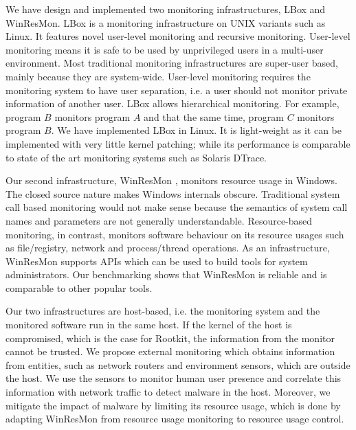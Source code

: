 We have design and implemented two monitoring infrastructures,
LBox and WinResMon.
LBox \cite{wu2005user} is a monitoring infrastructure on UNIX variants such as Linux.
It features novel user-level monitoring and recursive monitoring.
User-level monitoring means it is
safe to be used by unprivileged users in a multi-user environment.
Most traditional monitoring infrastructures are super-user based,
mainly because they are system-wide.
User-level monitoring requires the monitoring system to have user separation,
i.e. a user should not monitor private information of another user.
LBox allows hierarchical monitoring.
For example, program $B$ monitors program $A$ and that the same time,
program $C$ monitors program $B$.
We have implemented LBox in Linux.
It is light-weight as it can be implemented with very little kernel patching;
while its performance is comparable to state of the art monitoring systems
such as Solaris DTrace.

Our second infrastructure, WinResMon \cite{ramnath2006winresmon},
monitors resource usage in Windows.
The closed source nature makes Windows internals obscure.
Traditional system call based monitoring would not make sense
because the semantics of system call names and parameters are not
generally understandable.
Resource-based monitoring, in contrast,
monitors software behaviour on its resource usages such as
file/registry, network and process/thread operations.
As an infrastructure, WinResMon supports APIs which
can be used to build tools for system administrators.
Our benchmarking shows that WinResMon is reliable and
is comparable to other popular tools.

Our two infrastructures are host-based, i.e.
the monitoring system and the monitored software run in the same host.
If the kernel of the host is compromised,
which is the case for Rootkit,
the information from the monitor cannot be trusted.
We propose external monitoring \cite{chang2010enhancing} which obtains information from entities,
such as network routers and environment sensors, which are outside the host.
We use the sensors to monitor human user presence and correlate
this information with network traffic to detect malware in the host.
Moreover, we mitigate the impact of malware by limiting its resource usage,
which is done by adapting WinResMon from resource usage monitoring to
resource usage control.

